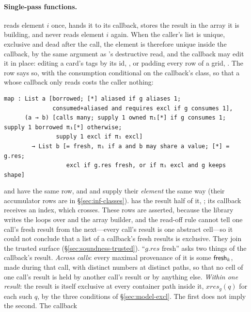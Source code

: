 \paragraph{Single-pass functions.}  reads element $i$ once, hands it to its callback, stores the
result in the array it is building, and never reads element $i$ again. When the caller's list is unique,
exclusive and dead after the call, the element is therefore unique inside the callback, by the same
argument as 's destructive read, and the callback may edit it in place: editing a card's tags
by its id, ,
or padding every row of a grid, . The row says so, with the
consumption conditional on the callback's class, so that a  whose callback only reads costs
the caller nothing:
\begin{Verbatim}
map : List a [borrowed; [*] aliased if g aliases 1;
              consumed+aliased and requires excl if g consumes 1],
      (a → b) [calls many; supply 1 owned π₁[*] if g consumes 1; supply 1 borrowed π₁[*] otherwise;
               supply 1 excl if π₁ excl]
        → List b [= fresh, π₁ if a and b may share a value; [*] = g.res;
                  excl if g.res fresh, or if π₁ excl and g keeps shape]
\end{Verbatim}
 and  have the same row, and  and  supply their
\emph{element} the same way (their accumulator rows are in \S\ref{sec:inf-classes}). 
has the result half of it, ; its callback receives an index, which
crosses. These rows are asserted, because the library writes the loops over  and the array
builder, and the read-off rule cannot tell one call's fresh result from the next---every call's result is
one abstract cell---so it could not conclude that a list of a callback's fresh results is exclusive. They
join the trusted surface (\S\ref{sec:soundness-trusted}). ``$g.\mathit{res}$ fresh'' asks two things
of the callback's result. \emph{Across calls}: every maximal provenance of it is some $\mathsf{fresh}_k$, made
during that call, with distinct numbers at distinct paths, so that no cell of one call's result is held
by another call's result or by anything else. \emph{Within one result}: the result is itself exclusive at
every container path inside it, $\mathit{xres}_g(q)$ for each such $q$, by the three conditions of
\S\ref{sec:model-excl}. The first does not imply the second. The callback
